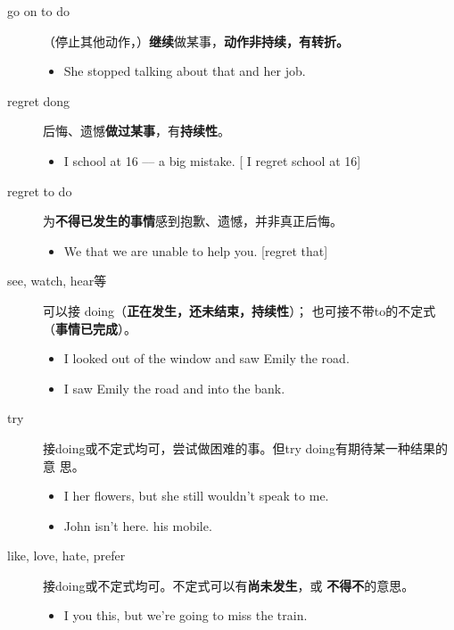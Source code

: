 \begin{description}
\item[go on to do] （停止其他动作，）\textbf{继续}做某事，\textbf{动作非持续，有转折。}

  \begin{itemize}
  \item She stopped talking about that and  her job.
  \end{itemize}

\item[regret dong] 后悔、遗憾\textbf{做过某事}，有\textbf{持续性}。

  \begin{itemize}
  \item I  school at 16 –-- a big mistake. [ I regret  school at 16]
  \end{itemize}

\item[regret to do] 为\textbf{不得已发生的事情}感到抱歉、遗憾，并非真正后悔。

  \begin{itemize}
  \item We  that we are unable to help you. [regret  that]
  \end{itemize}

\item[see, watch, hear等] 可以接 doing（\textbf{正在发生，还未结束，持续性}）；
  也可接不带to的不定式（\textbf{事情已完成}）。
  \begin{itemize}
  \item I looked out of the window and saw Emily  the road.
  \item I saw Emily  the road and  into the bank.
  \end{itemize}


\item[try] 接doing或不定式均可，尝试做困难的事。但try doing有期待某一种结果的意
  思。
  \begin{itemize}
  \item I  her flowers, but she still wouldn't speak to me.
  \item John isn't here.  his mobile.
  \end{itemize}

\item[like, love, hate, prefer] 接doing或不定式均可。不定式可以有\textbf{尚未发生}，或
  \textbf{不得不}的意思。
  \begin{itemize}
  \item I  you this, but we're going to miss the train.


\end{itemize}
\end{description}
